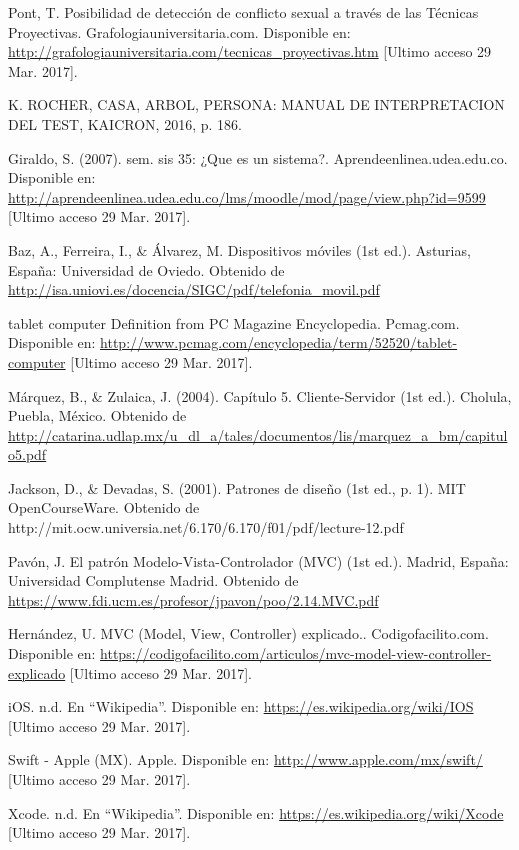 \documentclass[oneside,12pt]{book}
\begin{document}
\begin{thebibliography}{50}
Pont, T. Posibilidad de detección de conflicto sexual a través de las Técnicas Proyectivas. Grafologiauniversitaria.com. Disponible en: \url{http://grafologiauniversitaria.com/tecnicas_proyectivas.htm} [Ultimo acceso 29 Mar. 2017].

K. ROCHER, CASA, ARBOL, PERSONA: MANUAL DE INTERPRETACION DEL TEST, KAICRON, 2016, p. 186.

Giraldo, S. (2007). sem. sis 35: ¿Que es un sistema?. Aprendeenlinea.udea.edu.co. Disponible en: \url{http://aprendeenlinea.udea.edu.co/lms/moodle/mod/page/view.php?id=9599} [Ultimo acceso 29 Mar. 2017].

Baz, A., Ferreira, I., \& Álvarez, M. Dispositivos móviles (1st ed.). Asturias, España: Universidad de Oviedo. Obtenido de \url{http://isa.uniovi.es/docencia/SIGC/pdf/telefonia_movil.pdf}

tablet computer Definition from PC Magazine Encyclopedia. Pcmag.com. Disponible en: \url{http://www.pcmag.com/encyclopedia/term/52520/tablet-computer} [Ultimo acceso 29 Mar. 2017].

Márquez, B., \& Zulaica, J. (2004). Capítulo 5. Cliente-Servidor (1st ed.). Cholula, Puebla, México. Obtenido de \url{http://catarina.udlap.mx/u_dl_a/tales/documentos/lis/marquez_a_bm/capitulo5.pdf}

Jackson, D., \& Devadas, S. (2001). Patrones de diseño (1st ed., p. 1). MIT OpenCourseWare. Obtenido de http://mit.ocw.universia.net/6.170/6.170/f01/pdf/lecture-12.pdf

Pavón, J. El patrón Modelo-Vista-Controlador (MVC) (1st ed.). Madrid, España: Universidad Complutense Madrid. Obtenido de \url{https://www.fdi.ucm.es/profesor/jpavon/poo/2.14.MVC.pdf}

 Hernández, U. MVC (Model, View, Controller) explicado.. Codigofacilito.com. Disponible en: \url{https://codigofacilito.com/articulos/mvc-model-view-controller-explicado} [Ultimo acceso 29 Mar. 2017].

iOS. n.d. En ``Wikipedia''. Disponible en: \url{https://es.wikipedia.org/wiki/IOS} [Ultimo acceso 29 Mar. 2017].

Swift - Apple (MX). Apple. Disponible en: \url{http://www.apple.com/mx/swift/} [Ultimo acceso 29 Mar. 2017].

Xcode. n.d. En ``Wikipedia''. Disponible en: \url{https://es.wikipedia.org/wiki/Xcode} [Ultimo acceso 29 Mar. 2017].


\end{thebibliography}
\end{document}
